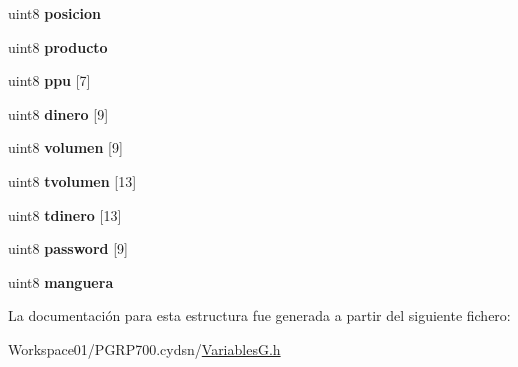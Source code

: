 \begin{DoxyCompactItemize}
uint8 {\bfseries posicion}
\item 
\mbox{\label{structrecibo_a0e25b4b82ec95f2b7c0c98ea0c13e834}} 
uint8 {\bfseries producto}
\item 
\mbox{\label{structrecibo_a174dd8047f2ee159579d40fc075b79bc}} 
uint8 {\bfseries ppu} \mbox{[}7\mbox{]}
\item 
\mbox{\label{structrecibo_a2173ebbc29e179804435dfe6131d71de}} 
uint8 {\bfseries dinero} \mbox{[}9\mbox{]}
\item 
\mbox{\label{structrecibo_ab6097b4f6a2ab687ab7be4ff96b549b2}} 
uint8 {\bfseries volumen} \mbox{[}9\mbox{]}
\item 
\mbox{\label{structrecibo_ae2b311e1ea4f046c439cf06e0fcc3054}} 
uint8 {\bfseries tvolumen} \mbox{[}13\mbox{]}
\item 
\mbox{\label{structrecibo_aa8a7bb931aad124fb0d136db7747edd5}} 
uint8 {\bfseries tdinero} \mbox{[}13\mbox{]}
\item 
\mbox{\label{structrecibo_abeabd3e6083f7fd6f6b18b950ab9904b}} 
uint8 {\bfseries password} \mbox{[}9\mbox{]}
\item 
\mbox{\label{structrecibo_a44063ee06b57fe21bcd41b22f2500ce4}} 
uint8 {\bfseries manguera}
\end{DoxyCompactItemize}


La documentación para esta estructura fue generada a partir del siguiente fichero\+:\begin{DoxyCompactItemize}
\item 
Workspace01/\+P\+G\+R\+P700.\+cydsn/\mbox{\hyperlink{_variables_g_8h}{Variables\+G.\+h}}\end{DoxyCompactItemize}
